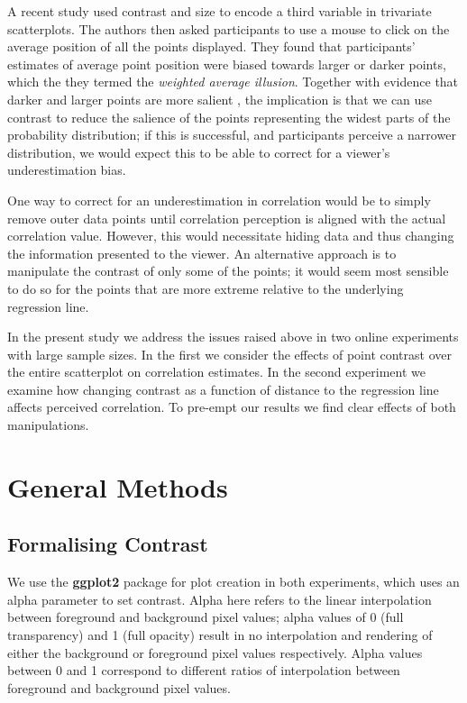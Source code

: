 \documentclass[preprint, 3p,
authoryear]{elsarticle} %
\begin{document}
A recent study \citep{hong_2021} used contrast and size to encode a
third variable in trivariate scatterplots. The authors then asked
participants to use a mouse to click on the average position of all the
points displayed. They found that participants' estimates of average
point position were biased towards larger or darker points, which the
they termed the \emph{weighted average illusion}. Together with evidence
that darker and larger points are more salient \citep{healey_2012}, the
implication is that we can use contrast to reduce the salience of the
points representing the widest parts of the probability distribution; if
this is successful, and participants perceive a narrower distribution,
we would expect this to be able to correct for a viewer's
underestimation bias.

One way to correct for an underestimation in correlation would be to
simply remove outer data points until correlation perception is aligned
with the actual correlation value. However, this would necessitate
hiding data and thus changing the information presented to the viewer.
An alternative approach is to manipulate the contrast of only some of
the points; it would seem most sensible to do so for the points that are
more extreme relative to the underlying regression line.

In the present study we address the issues raised above in two online
experiments with large sample sizes. In the first we consider the
effects of point contrast over the entire scatterplot on correlation
estimates. In the second experiment we examine how changing contrast as
a function of distance to the regression line affects perceived
correlation. To pre-empt our results we find clear effects of both
manipulations.

\hypertarget{general-methods}{%
\section{General Methods}\label{general-methods}}

\hypertarget{formalising-contrast}{%
\subsection{Formalising Contrast}\label{formalising-contrast}}

We use the \textbf{ggplot2} \citep{hadley_gg2016} package for plot
creation in both experiments, which uses an alpha parameter to set
contrast. Alpha here refers to the linear interpolation
\citep{stone_2008} between foreground and background pixel values; alpha
values of 0 (full transparency) and 1 (full opacity) result in no
interpolation and rendering of either the background or foreground pixel
values respectively. Alpha values between 0 and 1 correspond to
different ratios of interpolation between foreground and background
pixel values.
\end{document}
